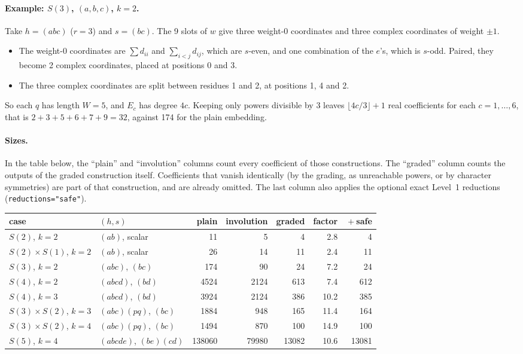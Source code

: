 \documentclass[11pt]{article}
\theoremstyle{definition}
\theoremstyle{remark}
\begin{document}
\paragraph{Example: $S(3)$, $(a, b, c)$, $k = 2$.}
Take $h = (abc)$ ($r = 3$) and $s = (bc)$. The 9 slots of $w$ give three
weight-0 coordinates and three complex coordinates of weight $\pm 1$.
\begin{itemize}
  \item The weight-0 coordinates are $\sum d_{ii}$ and $\sum_{i<j} d_{ij}$,
    which are $s$-even, and one combination of the $e$'s, which is $s$-odd.
    Paired, they become 2 complex coordinates, placed at positions 0 and 3.
  \item The three complex coordinates are split between residues 1 and 2, at
    positions 1, 4 and 2.
\end{itemize}
So each $q$ has length $W = 5$, and $E_c$ has degree $4c$. Keeping only powers
divisible by 3 leaves $\lfloor 4c/3 \rfloor + 1$ real coefficients for each
$c = 1, \ldots, 6$, that is $2 + 3 + 5 + 6 + 7 + 9 = 32$, against 174 for the
plain embedding.

\paragraph{Sizes.}
In the table below, the ``plain'' and ``involution'' columns count every
coefficient of those constructions. The ``graded'' column counts the outputs of
the graded construction itself. Coefficients that vanish identically (by the
grading, as unreachable powers, or by character symmetries) are part of that
construction, and are already omitted. The last column also applies the
optional exact Level~1 reductions (\texttt{reductions="safe"}).
\begin{center}
\small
\begin{tabular}{llrrrrr}
  case & $(h, s)$ & plain & involution & graded & factor & ${}+{}$safe \\ \hline
  $S(2)$, $k=2$            & $(ab)$, scalar          & 11     & 5     & 4     & 2.8  & 4 \\
  $S(2)\times S(1)$, $k=2$ & $(ab)$, scalar          & 26     & 14    & 11    & 2.4  & 11 \\
  $S(3)$, $k=2$            & $(abc)$, $(bc)$         & 174    & 90    & 24    & 7.2  & 24 \\
  $S(4)$, $k=2$            & $(abcd)$, $(bd)$        & 4524   & 2124  & 613   & 7.4  & 612 \\
  $S(4)$, $k=3$            & $(abcd)$, $(bd)$        & 3924   & 2124  & 386   & 10.2 & 385 \\
  $S(3)\times S(2)$, $k=3$ & $(abc)(pq)$, $(bc)$     & 1884   & 948   & 165   & 11.4 & 164 \\
  $S(3)\times S(2)$, $k=4$ & $(abc)(pq)$, $(bc)$     & 1494   & 870   & 100   & 14.9 & 100 \\
  $S(5)$, $k=4$            & $(abcde)$, $(be)(cd)$   & 138060 & 79980 & 13082 & 10.6 & 13081
\end{tabular}
\end{center}
\end{document}
